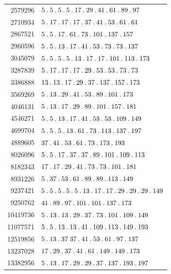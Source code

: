 \begin{longtable}{@{}r|l@{}}
2579296 & $5\pdot 5\pdot 5\pdot 5\pdot 17\pdot 29\pdot 41\pdot 61\pdot 89\pdot 97$\\
2710934 & $5\pdot 17\pdot 17\pdot 17\pdot 37\pdot 41\pdot 53\pdot 61\pdot 61$\\
2867521 & $5\pdot 5\pdot 17\pdot 61\pdot 73\pdot 101\pdot 137\pdot 157$\\
2960596 & $5\pdot 5\pdot 13\pdot 17\pdot 41\pdot 53\pdot 73\pdot 73\pdot 137$\\
3045079 & $5\pdot 5\pdot 5\pdot 5\pdot 13\pdot 17\pdot 17\pdot 101\pdot 113\pdot 173$\\
3287839 & $5\pdot 17\pdot 17\pdot 17\pdot 29\pdot 53\pdot 53\pdot 73\pdot 73$\\
3386888 & $13\pdot 13\pdot 17\pdot 29\pdot 37\pdot 137\pdot 157\pdot 173$\\
3569269 & $5\pdot 13\pdot 29\pdot 41\pdot 53\pdot 89\pdot 101\pdot 173$\\
4046131 & $5\pdot 13\pdot 17\pdot 29\pdot 89\pdot 101\pdot 157\pdot 181$\\
4546271 & $5\pdot 5\pdot 13\pdot 17\pdot 41\pdot 53\pdot 53\pdot 109\pdot 149$\\
4699704 & $5\pdot 5\pdot 5\pdot 13\pdot 61\pdot 73\pdot 113\pdot 137\pdot 197$\\
4889605 & $37\pdot 41\pdot 53\pdot 61\pdot 73\pdot 173\pdot 193$\\
8026096 & $5\pdot 5\pdot 17\pdot 37\pdot 37\pdot 89\pdot 101\pdot 109\pdot 113$\\
8182343 & $17\pdot 17\pdot 29\pdot 41\pdot 73\pdot 73\pdot 101\pdot 181$\\
8931226 & $5\pdot 37\pdot 53\pdot 61\pdot 89\pdot 89\pdot 113\pdot 149$\\
9237421 & $5\pdot 5\pdot 5\pdot 5\pdot 5\pdot 13\pdot 17\pdot 17\pdot 29\pdot 29\pdot 29\pdot 149$\\
9250762 & $41\pdot 89\pdot 97\pdot 101\pdot 101\pdot 137\pdot 173$\\
10419736 & $5\pdot 13\pdot 13\pdot 29\pdot 37\pdot 73\pdot 101\pdot 109\pdot 149$\\
11077571 & $5\pdot 5\pdot 13\pdot 13\pdot 41\pdot 109\pdot 113\pdot 149\pdot 193$\\
12519856 & $5\pdot 13\pdot 37\;37\pdot 41\pdot 53\pdot 61\pdot 97\pdot 137$\\
13237028 & $17\pdot 29\pdot 37\pdot 41\pdot 61\pdot 149\pdot 149\pdot 173$\\
13382956 & $5\pdot 13\pdot 17\pdot 29\pdot 29\pdot 37\pdot 137\pdot 193\pdot 197$\\

\end{longtable}
